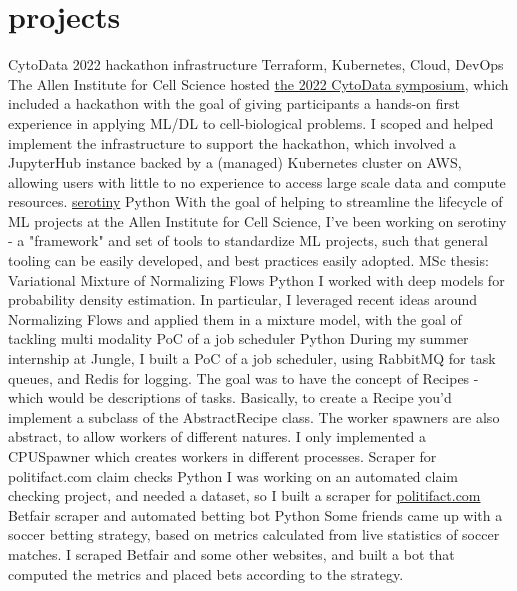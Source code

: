 \documentclass[]{colobas-cv}
\begin{document}
\section{projects}

\entry
  {}
  {CytoData 2022 hackathon infrastructure}
  {Terraform, Kubernetes, Cloud, DevOps}
  {The Allen Institute for Cell Science hosted
    \href{https://www.cytodata.org/symposia/2022/}{the 2022 CytoData symposium},
    which included a hackathon with the goal of giving participants a hands-on
    first experience in applying ML/DL to cell-biological problems.
    I scoped and helped implement the infrastructure to support the hackathon,
    which involved a JupyterHub instance backed by a (managed) Kubernetes cluster
    on AWS, allowing users with little to no experience to access large scale
    data and compute resources.}
\entry
  {}
  {\href{https://allencell.org/serotiny}{serotiny}}
  {Python}
  {With the goal of helping to streamline the lifecycle of ML projects at
   the Allen Institute for Cell Science, I've been working on serotiny - a
   "framework" and set of tools to standardize ML projects, such that general
   tooling can be easily developed, and best practices easily adopted.}
\entry
  {}
  {MSc thesis: Variational Mixture of Normalizing Flows}
  {Python}
  {I worked with deep models for probability density estimation. In particular,
   I leveraged recent ideas around Normalizing Flows and applied them
   in a mixture model, with the goal of tackling multi modality}
\entry
  {}
  {PoC of a job scheduler}
  {Python}
  {During my summer internship at Jungle, I built a PoC of a job scheduler,
  using RabbitMQ for task queues, and Redis for logging. The goal was to have
  the concept of Recipes - which would be descriptions of tasks. Basically,
  to create a Recipe you'd implement a subclass of the AbstractRecipe class.
  The worker spawners are also abstract, to allow workers of different natures.
  I only implemented a CPUSpawner which creates workers in different processes.}
\entry
  {}
  {Scraper for politifact.com claim checks}
  {Python}
  {I was working on an automated claim checking project, and needed a dataset,
  so I built a scraper for \href{politifact.com}{politifact.com}}
\entry
  {}
  {Betfair scraper and automated betting bot}
  {Python}
  {Some friends came up with a soccer betting strategy, based on metrics 
  calculated from live statistics of soccer matches. I scraped Betfair and some
  other websites, and built a bot that computed the metrics and placed bets
  according to the strategy.}
\end{document}
